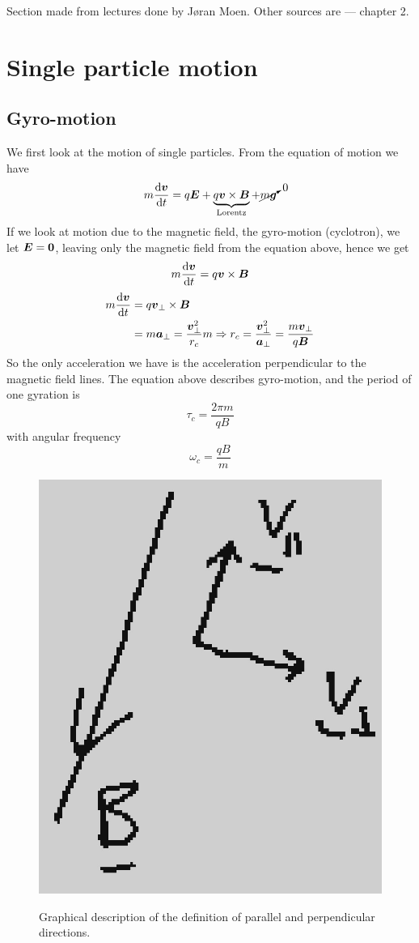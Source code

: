 \begin{remark}
    Section made from lectures done by Jøran Moen. Other sources are \citet{1995Itsp} --- chapter 2.
\end{remark}

\section{Single particle motion}
\subsection{Gyro-motion}
We first look at the motion of single particles. From the equation of motion we have
\begin{equation*}
    m\frac{\text{d}\boldsymbol{v}}{\text{d}t}=q\boldsymbol{E}+\underbrace{q\boldsymbol{v}\times\boldsymbol{B}}_{\text{Lorentz}}+\cancelto{0}{m\boldsymbol{g}}
\end{equation*}
If we look at motion due to the magnetic field, the gyro-motion (cyclotron), we let \(\boldsymbol{E}=\boldsymbol{0}\), leaving only the magnetic field from the equation above, hence we get
\begin{equation*}
    m\frac{\text{d}{\boldsymbol{v}}}{\text{d}t}=q\boldsymbol{v}\times\boldsymbol{B}
\end{equation*}
\begin{align*}
    m\frac{\text{d}\boldsymbol{v}}{\text{d}t}&=q\boldsymbol{v}_\perp\times\boldsymbol{B}\\
    &=m\boldsymbol{a}_\perp=\frac{\boldsymbol{v}_\perp^2}{r_c}m\Rightarrow r_c=\frac{\boldsymbol{v}_\perp^2}{\boldsymbol{a}_\perp}=\frac{m\boldsymbol{v}_\perp}{q\boldsymbol{B}}
\end{align*}
So the only acceleration we have is the acceleration perpendicular to the magnetic field lines. The equation above describes gyro-motion, and the period of one gyration is
\begin{equation*}
    \tau_c=\frac{2\pi m}{qB}
\end{equation*}
with angular frequency
\begin{equation*}
    \omega_c=\frac{qB}{m}
\end{equation*}
\begin{figure}[t]
    \centering
    \includegraphics[width=.15\linewidth]{bilder/v_decomp.jpg}\label{fig:v_decomp}
    \caption{Graphical description of the definition of parallel and perpendicular directions.}
\end{figure}

